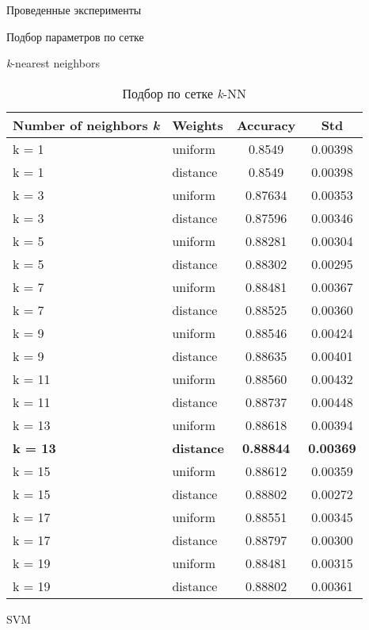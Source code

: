 \begin{section}{Проведенные эксперименты}
\begin{subsection}{Подбор параметров по сетке}
\begin{subsubsection}{\textit{k}-nearest neighbors}
  \begin{table}[H]
  \centering
  {\begin{tabular}{|l|l|c|c|}
  \hline
  \textbf{Number of neighbors \textit{k}} & \textbf{Weights} & \textbf{Accuracy} & \textbf{Std} \\
  \hline
  k = 1 & uniform  & 0.8549 & 0.00398 \\
  \hline
  k = 1 & distance  & 0.8549 & 0.00398 \\
  \hline
  k = 3 & uniform  & 0.87634 & 0.00353 \\
  \hline
  k = 3 &  distance & 0.87596  & 0.00346 \\
  \hline
  k = 5 & uniform  & 0.88281 & 0.00304 \\
  \hline
  k = 5 & distance  & 0.88302 & 0.00295 \\
  \hline
  k = 7 & uniform  & 0.88481 & 0.00367 \\
  \hline
  k = 7 &  distance & 0.88525  & 0.00360 \\
  \hline
  k = 9 & uniform  & 0.88546 & 0.00424 \\
  \hline
  k = 9 & distance  & 0.88635 & 0.00401 \\
  \hline
  k = 11 & uniform  & 0.88560 & 0.00432 \\
  \hline
  k = 11 &  distance & 0.88737  & 0.00448 \\
  \hline
  k = 13 & uniform  & 0.88618 &  0.00394 \\
  \hline
  \textbf{k = 13} & \textbf{distance}  & \textbf{0.88844} & \textbf{0.00369} \\
  \hline
  k = 15 & uniform  & 0.88612 & 0.00359 \\
  \hline
  k = 15 &  distance & 0.88802  & 0.00272 \\
  \hline
  k = 17 & uniform  & 0.88551 & 0.00345 \\
  \hline
  k = 17 & distance  & 0.88797 & 0.00300 \\
  \hline
  k = 19 & uniform  & 0.88481 & 0.00315 \\
  \hline
  k = 19 &  distance & 0.88802  & 0.00361 \\
  \hline
  \end{tabular}}

  \caption{Подбор по сетке \textit{k}-NN}
  \label{grid:knn}
  \end{table}



\end{subsubsection}

\begin{subsubsection}{SVM}



\end{subsubsection}
\end{subsection}
\end{section}
